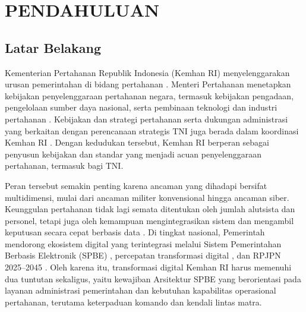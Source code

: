 \cleardoublepage
\chapter{PENDAHULUAN}
\label{chap:I}

\section{Latar Belakang}
\label{sec:I.1}

Kementerian Pertahanan Republik Indonesia (Kemhan\label{sk:Kemhan} RI\label{sk:RI}) menyelenggarakan urusan pemerintahan di bidang pertahanan \cite{Permenhan13Tahun2026}. Menteri Pertahanan menetapkan kebijakan penyelenggaraan pertahanan negara, termasuk kebijakan pengadaan, pengelolaan sumber daya nasional, serta pembinaan teknologi dan industri pertahanan \cite{UU3Tahun2002}. Kebijakan dan strategi pertahanan serta dukungan administrasi yang berkaitan dengan perencanaan strategis TNI\label{sk:TNI} juga berada dalam koordinasi Kemhan RI \cite{UU3Tahun2025}. Dengan kedudukan tersebut, Kemhan RI berperan sebagai penyusun kebijakan dan standar yang menjadi acuan penyelenggaraan pertahanan, termasuk bagi TNI.

Peran tersebut semakin penting karena ancaman yang dihadapi bersifat multidimensi, mulai dari ancaman militer konvensional hingga ancaman siber. Keunggulan pertahanan tidak lagi semata ditentukan oleh jumlah alutsista dan personel, tetapi juga oleh kemampuan mengintegrasikan sistem dan mengambil keputusan secara cepat berbasis data \cite{USDoD2019,Koch2015,USDoD2022}. Di tingkat nasional, Pemerintah mendorong ekosistem digital yang terintegrasi melalui Sistem Pemerintahan Berbasis Elektronik (SPBE\label{sk:SPBE}) \cite{Perpres95Tahun2018}, percepatan transformasi digital \cite{Perpres82Tahun2023}, dan RPJPN\label{sk:RPJPN} 2025–2045 \cite{UU59Tahun2024}. Oleh karena itu, transformasi digital Kemhan RI harus memenuhi dua tuntutan sekaligus, yaitu kewajiban Arsitektur SPBE yang berorientasi pada layanan administrasi pemerintahan dan kebutuhan kapabilitas operasional pertahanan, terutama keterpaduan komando dan kendali lintas matra.

